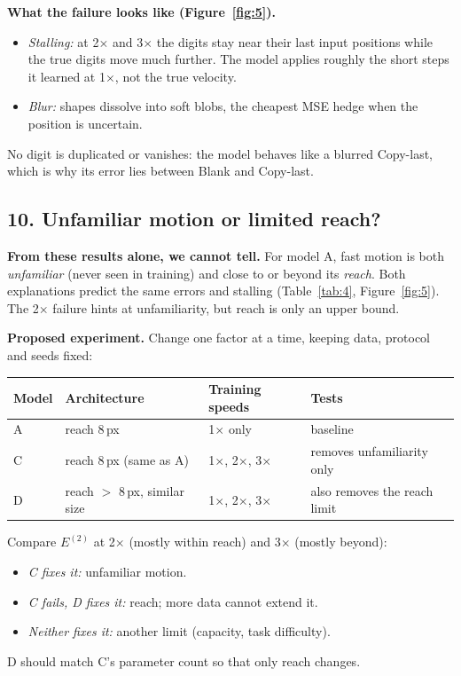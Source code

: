\documentclass[11pt, a4paper]{article}
\begin{document}
\textbf{What the failure looks like (Figure~\ref{fig:5}).}
\begin{itemize}[itemsep=0pt]
  \item \emph{Stalling:} at 2$\times$ and 3$\times$ the digits stay near their last input positions while the true digits move much further. The model applies roughly the short steps it learned at 1$\times$, not the true velocity.
  \item \emph{Blur:} shapes dissolve into soft blobs, the cheapest MSE hedge when the position is uncertain.
\end{itemize}
No digit is duplicated or vanishes: the model behaves like a blurred Copy-last, which is why its error lies between Blank and Copy-last.

\subsection*{10. Unfamiliar motion or limited reach?}

\textbf{From these results alone, we cannot tell.} For model A, fast motion is both \emph{unfamiliar} (never seen in training) and close to or beyond its \emph{reach}. Both explanations predict the same errors and stalling (Table~\ref{tab:4}, Figure~\ref{fig:5}). The 2$\times$ failure hints at unfamiliarity, but reach is only an upper bound.

\textbf{Proposed experiment.} Change one factor at a time, keeping data, protocol and seeds fixed:

\begin{center}
\begin{tabular}{llll}
\toprule
Model & Architecture & Training speeds & Tests \\
\midrule
A & reach 8\,px & 1$\times$ only & baseline \\
C & reach 8\,px (same as A) & 1$\times$, 2$\times$, 3$\times$ & removes unfamiliarity only \\
D & reach $>$ 8\,px, similar size & 1$\times$, 2$\times$, 3$\times$ & also removes the reach limit \\
\bottomrule
\end{tabular}
\end{center}

Compare $E^{(2)}$ at 2$\times$ (mostly within reach) and 3$\times$ (mostly beyond):
\begin{itemize}[itemsep=0pt]
  \item \emph{C fixes it:} unfamiliar motion.
  \item \emph{C fails, D fixes it:} reach; more data cannot extend it.
  \item \emph{Neither fixes it:} another limit (capacity, task difficulty).
\end{itemize}
D should match C's parameter count so that only reach changes.
\end{document}
